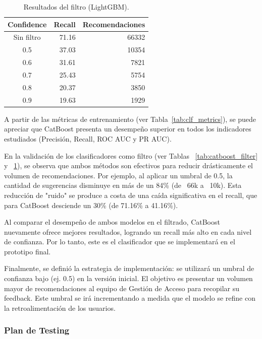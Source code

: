 \documentclass[11pt,letterpaper]{article}
\begin{document}
\begin{itemize}
\begin{table}[h!]
    \centering
    \caption{Resultados del filtro (LightGBM).}
    \label{tab:lightgbm_filter}
    \begin{tabular}{@{}crr@{}}
        \toprule
        Confidence & Recall & Recomendaciones \\
        \midrule
        Sin filtro & 71.16 & 66332 \\
        0.5 & 37.03 & 10354 \\
        0.6 & 31.61 & 7821 \\
        0.7 & 25.43 & 5754 \\
        0.8 & 20.37 & 3850 \\
        0.9 & 19.63 & 1929 \\
        \bottomrule
    \end{tabular}
\end{table}

A partir de las métricas de entrenamiento (ver Tabla~\ref{tab:clf_metrics}), 
se puede apreciar que CatBoost presenta un desempeño superior en todos 
los indicadores estudiados (Precisión, Recall, ROC AUC y PR AUC).

En la validación de los clasificadores como filtro 
(ver Tablas ~\ref{tab:catboost_filter} y ~\ref{tab:lightgbm_filter}), se observa que ambos métodos son 
efectivos para reducir drásticamente el volumen de recomendaciones. 
Por ejemplo, al aplicar un umbral de 0.5, la cantidad de sugerencias 
disminuye en más de un 84\% (de ~66k a ~10k). Esta reducción de 
"ruido" se produce a costa de una caída significativa en el recall, 
que para CatBoost desciende un 30\% (de 71.16\% a 41.16\%).

Al comparar el desempeño de ambos modelos en el filtrado, CatBoost
nuevamente ofrece mejores resultados, logrando un recall más alto en
cada nivel de confianza. Por lo tanto, este es el clasificador que se
implementará en el prototipo final.

Finalmente, se definió la estrategia de implementación: se utilizará un
umbral de confianza bajo (ej. 0.5) en la versión inicial. El objetivo es
presentar un volumen mayor de recomendaciones al equipo de Gestión de
Acceso para recopilar su feedback. Este umbral se irá incrementando a
medida que el modelo se refine con la retroalimentación de los usuarios.

\hypertarget{plan-de-testing}{%
\subsubsection{Plan de Testing}\label{plan-de-testing}}


\end{itemize}
\end{document}
